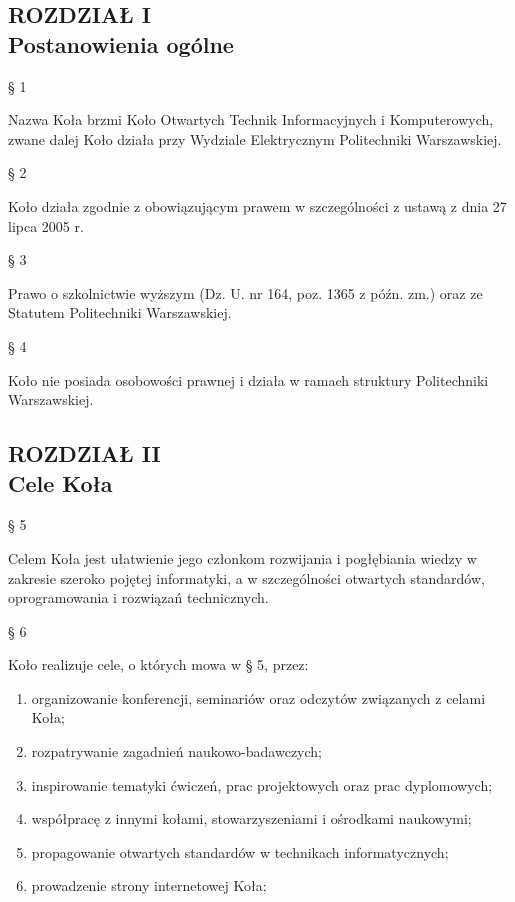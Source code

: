 \documentclass[a4paper,11pt]{article}
\renewcommand{\paragraph}[1] {\begin{center}§ {#1}\end{center}}
\newcommand{\content}[1] {\begin{flushleft}{#1}\end{flushleft}}
\newcommand{\chapter}[2] {\begin{center}\section*{ROZDZIAŁ {#1} \\ {#2}}\end{center}}
\begin{document}
\chapter{I}{Postanowienia ogólne}

\paragraph{1}
\content{Nazwa Koła brzmi Koło Otwartych Technik Informacyjnych i Komputerowych, zwane dalej Koło działa przy Wydziale Elektrycznym Politechniki Warszawskiej.}

\paragraph{2}
\content{Koło działa zgodnie z obowiązującym prawem w szczególności z ustawą z dnia 27 lipca 2005 r.}

\paragraph{3}
\content{Prawo  o  szkolnictwie  wyższym (Dz.  U.  nr  164,  poz.  1365  z  późn.  zm.)  oraz  ze  Statutem Politechniki Warszawskiej.}

\paragraph{4}
\content{Koło nie posiada osobowości prawnej i działa w ramach struktury Politechniki Warszawskiej.}

\chapter{II}{Cele Koła}

\paragraph{5}
\content{Celem Koła jest ułatwienie jego członkom rozwijania i pogłębiania wiedzy w zakresie szeroko pojętej  informatyki,  a  w  szczególności  otwartych  standardów,  oprogramowania  i  rozwiązań technicznych.}

\paragraph{6}
Koło realizuje cele, o których mowa w § 5, przez: 
\begin{enumerate}
	\item organizowanie konferencji, seminariów oraz odczytów związanych z celami Koła;
	\item rozpatrywanie zagadnień naukowo-badawczych;
	\item inspirowanie tematyki ćwiczeń, prac projektowych oraz prac dyplomowych;
	\item współpracę z innymi kołami, stowarzyszeniami i ośrodkami naukowymi;
	\item propagowanie otwartych standardów w technikach informatycznych;
	\item prowadzenie strony internetowej Koła;
\end{enumerate}
\end{document}
